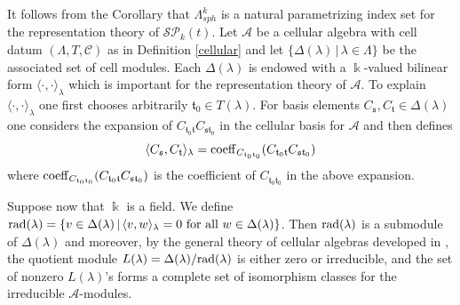 \documentclass[10pt,hidelinks]{article}
\newcommand{\coeff}{{\rm coeff} }
\newcommand{\rad}{{\rm rad} }
\newcommand{\PP}{\Lambda }
\newcommand{\SpheAlg}{{\mathcal{SP} }_{k}}
\newcommand{\s}{\mathfrak{s}}
\newcommand{\T}{  \mathfrak{t}}
\newtheorem{example}{Example}
\numberwithin{equation}{section}
\begin{document}


\medskip


It follows from the Corollary that $  \Lambda_{sph}^{k}  $ is a natural parametrizing index set for the representation
theory of $ \SpheAlg(t) $.
Let $ \mathcal A $ be a cellular algebra with cell datum $(\PP,T,\mathcal{C})$ 
as in Definition \ref{cellular} and let $ \{ \Delta(\lambda) \, | \,  \lambda \in \Lambda \} $ be the associated set of cell modules. 
Each $ \Delta(\lambda) $ is endowed with a $ \Bbbk $-valued bilinear form $ \langle \cdot, \cdot \rangle_{\lambda} $
which is important for the representation theory of $ \mathcal A $. To explain $ \langle \cdot, \cdot \rangle_{\lambda} $
one first chooses arbitrarily $ \T_0 \in T(\lambda) $. For basis elements $ C_{\s}, C_{\T} \in \Delta(\lambda) $ 
one considers the expansion of $ C_{\T_0 \T} C_{ \s \T_0 }  $ in the cellular basis for $ \mathcal A$ and then defines
\begin{equation}\label{intheaboveexpansion}
\langle C_{\s}, C_{\T} \rangle_{\lambda}= \coeff_{  C_{\T_0 \T_0 }}(C_{\T_0 \T} C_{ \s \T_0 })
\end{equation}
where $ \coeff_{  C_{\T_0 \T_0 }}(C_{\T_0 \T} C_{ \s \T_0 }) $ is the coefficient of
$ C_{\T_0 \T_0}  $ in the above expansion.

\medskip
Suppose now that $ \Bbbk $ is a field. We define $ \rad(\lambda) =
\{ v \in \Delta(\lambda) \, | \, \langle v , w \rangle_{\lambda} =0 \mbox{ for all } w \in \Delta(\lambda) \} $.
Then $  \rad(\lambda) $ is a submodule of $ \Delta(\lambda) $ and moreover, by the general theory of cellular algebras
developed in \cite{GL}, the quotient module $ L(\lambda) = \Delta(\lambda)/\rad(\lambda) $ is either zero or irreducible,
and the set of nonzero $ L(\lambda)$'s forms a complete set of isomorphism classes for the irreducible $ \mathcal A$-modules.
\end{document}

